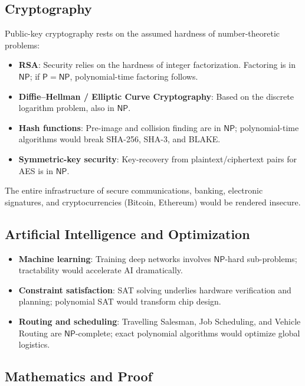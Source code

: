 \documentclass[12pt,a4paper]{amsart}
\theoremstyle{definition}
\newcommand{\Pclass}{\mathsf{P}}
\newcommand{\NP}{\mathsf{NP}}
\begin{document}
\subsection{Cryptography}

Public-key cryptography rests on the assumed hardness of number-theoretic
problems:
\begin{itemize}
  \item \textbf{RSA}: Security relies on the hardness of integer factorization.
    Factoring is in $\NP$; if $\Pclass=\NP$, polynomial-time factoring follows.
  \item \textbf{Diffie--Hellman / Elliptic Curve Cryptography}: Based on the
    discrete logarithm problem, also in $\NP$.
  \item \textbf{Hash functions}: Pre-image and collision finding are in $\NP$;
    polynomial-time algorithms would break SHA-256, SHA-3, and BLAKE.
  \item \textbf{Symmetric-key security}: Key-recovery from plaintext/ciphertext
    pairs for AES is in $\NP$.
\end{itemize}

The entire infrastructure of secure communications, banking, electronic
signatures, and cryptocurrencies (Bitcoin, Ethereum) would be rendered insecure.

\subsection{Artificial Intelligence and Optimization}

\begin{itemize}
  \item \textbf{Machine learning}: Training deep networks involves
    $\NP$-hard sub-problems; tractability would accelerate AI dramatically.
  \item \textbf{Constraint satisfaction}: SAT solving underlies hardware
    verification and planning; polynomial SAT would transform chip design.
  \item \textbf{Routing and scheduling}: Travelling Salesman, Job Scheduling,
    and Vehicle Routing are $\NP$-complete; exact polynomial algorithms would
    optimize global logistics.
\end{itemize}

\subsection{Mathematics and Proof}
\end{document}

